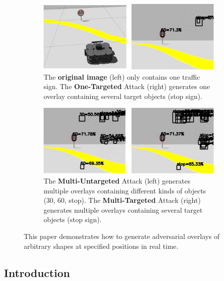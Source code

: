\begin{figure}[H]
    \centering
    \begin{subfigure}[b]{\textwidth}
        \includegraphics[width=\textwidth]{figures/chapter_detection/detection/one.jpg}
        \caption{The \textbf{original image} (left) only contains one traffic sign. The \textbf{One-Targeted} Attack (right) generates one overlay containing several target objects (stop sign).}
        \label{fig:sparse-untar} 
    \end{subfigure}

    \begin{subfigure}[b]{\textwidth}
        \includegraphics[width=\textwidth]{figures/chapter_detection/detection/multi.jpg}
        \caption{The \textbf{Multi-Untargeted} Attack (left) generates multiple overlays containing different kinds of objects (30, 60, stop). The \textbf{Multi-Targeted} Attack (right) generates multiple overlays containing several target objects (stop sign).}
        \label{fig:dense-untar}
    \end{subfigure}
    \caption{This paper demonstrates how to generate adversarial overlays of arbitrary shapes at specified positions in real time.}
    \label{fig:detection.overview}
\end{figure}

\subsection{Introduction}

